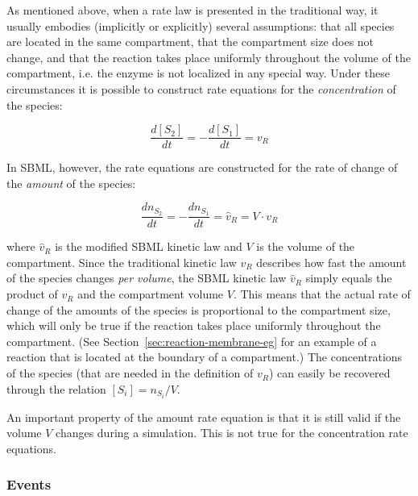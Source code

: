 As mentioned above, when a rate law is presented in the
traditional way, it usually embodies (implicitly or explicitly)
several assumptions: that all species are located in the same
compartment, that the compartment size does not change, and that
the reaction takes place uniformly throughout the volume of the
compartment, i.e. the enzyme is not localized in any special way.
Under these circumstances it is possible to construct rate
equations for the \emph{concentration} of the species:
\begin{linenomath}
  \begin{equation*}
    \frac{d[S_{2}]}{dt} = -\frac{d[S_{1}]}{dt} = v_{R}
  \end{equation*}
\end{linenomath}
In SBML, however, the rate equations are constructed for the rate
of change of the \emph{amount} of the species:
\begin{linenomath}
  \begin{equation*}
    \frac{dn_{S_{2}}}{dt} = -\frac{dn_{S_{1}}}{dt} = \hat{v}_{R} = V \cdot v_{R}
  \end{equation*}
\end{linenomath}
where $\hat{v}_{R}$ is the modified SBML kinetic law and $V$ is
the volume of the compartment.  Since the traditional kinetic law
$v_{R}$ describes how fast the amount of the species changes
\emph{per volume}, the SBML kinetic law $\hat{v}_{R}$ simply
equals the product of $v_{R}$ and the compartment volume $V$. This
means that the actual rate of change of the amounts of the species
is proportional to the compartment size, which will only be true
if the reaction takes place uniformly throughout the compartment.
(See Section~\ref{sec:reaction-membrane-eg} for an example of a
reaction that is located at the boundary of a compartment.)  The
concentrations of the species (that are needed in the definition
of $v_{R}$) can easily be recovered through the relation
$[S_{i}]=n_{S_{i}}/V$.

An important property of the amount rate equation is that it is still
valid if the volume $V$ changes during a simulation. This is not
true for the concentration rate equations. 


\subsubsection{Events}
\label{sec:bp:events}


